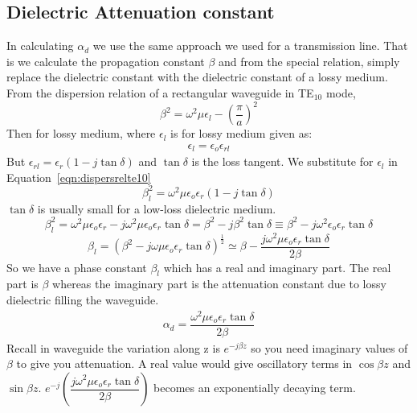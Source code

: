 \subsection{Dielectric Attenuation constant}
In calculating  $\alpha_{d}$ we use the same approach we used for a transmission line. That is we calculate the propagation constant $\beta$ and from the special relation, simply replace the dielectric constant with the dielectric constant of a lossy medium. From the dispersion relation of a rectangular waveguide in TE$_{10}$ mode,
\begin{equation}
\beta^{2} = \omega^{2}\mu\epsilon_{l} -\left(\frac{\pi}{a}\right)^{2}
\label{eqn:dispersrelte10}
\end{equation}
Then for lossy medium, where $\epsilon_{l}$ is for lossy medium given as:
\begin{align*}
\epsilon_{l} = \epsilon_{o}\epsilon_{rl}
\end{align*}
But $\epsilon_{rl} = \epsilon_{r}(1-j\tan\delta)$ and $\tan\delta$ is the loss tangent. We substitute for $\epsilon_{l}$ in Equation~\ref{eqn:dispersrelte10} 
\begin{equation*}
\beta^{2}_{l} = \omega^{2}\mu\epsilon_{o}\epsilon_{r}(1-j\tan\delta)
\end{equation*}
$\tan\delta$ is usually small for a low-loss dielectric medium.
\begin{dmath*}
\beta^{2}_{l} = \omega^{2}\mu\epsilon_{o}\epsilon_{r} - j\omega^{2}\mu\epsilon_{o}\epsilon_{r}\tan\delta = \beta^{2} - j\beta^{2}\tan\delta \equiv \beta^{2} - j\omega^{2}\epsilon_{o}\epsilon_{r}\tan\delta
\end{dmath*}
\begin{dmath}
\beta_{l} = (\beta^{2} - j\omega\mu\epsilon_{o}\epsilon_{r}\tan\delta)^{\frac{1}{2}} \simeq \beta - \dfrac{j\omega^{2}\mu\epsilon_{o}\epsilon_{r}\tan\delta}{2\beta}
\end{dmath}
So we have a phase constant $\beta_{l}$ which has a real and imaginary part. The real part is $\beta$ whereas the imaginary part is the attenuation constant due to lossy dielectric filling the waveguide.
\begin{align}
\alpha_{d} = \dfrac{\omega^{2}\mu\epsilon_{o}\epsilon_{r}\tan\delta}{2\beta}
\end{align}
Recall in waveguide the variation along z is $e^{-j\beta z}$ so you need imaginary values of $\beta$ to give you attenuation. A real value would give oscillatory terms in $\cos\beta z$ and $\sin\beta z$. $e^{-j}(\dfrac{j\omega^{2} \mu\epsilon_{o}\epsilon_{r}\tan\delta}{2\beta})$ becomes an exponentially decaying term.

